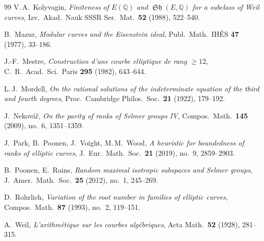 \documentclass[12pt,a4paper]{amsart}
\theoremstyle{definition}
\theoremstyle{remark}
\DeclareMathOperator{\Sha}{\mathfrak{Sh}}
\begin{document}
\begin{thebibliography}{99}
V.\,A.\ Kolyvagin,
\textit{Finiteness of $E(\mathbb{Q})$ and $\Sha(E,\mathbb{Q})$ for a subclass of
Weil curves},
Izv.\ Akad.\ Nauk SSSR Ser.\ Mat.\ \textbf{52} (1988), 522--540.

B.\ Mazur,
\textit{Modular curves and the Eisenstein ideal},
Publ.\ Math.\ IHÉS \textbf{47} (1977), 33--186.

J.-F.\ Mestre,
\textit{Construction d'une courbe elliptique de rang $\geq 12$},
C.\ R.\ Acad.\ Sci.\ Paris \textbf{295} (1982), 643--644.

L.\,J.\ Mordell,
\textit{On the rational solutions of the indeterminate equation of the third and fourth
degrees},
Proc.\ Cambridge Philos.\ Soc.\ \textbf{21} (1922), 179--192.

J.\ Nekovář,
\textit{On the parity of ranks of Selmer groups IV},
Compos.\ Math.\ \textbf{145} (2009), no.\ 6, 1351--1359.

J.\ Park, B.\ Poonen, J.\ Voight, M.\,M.\ Wood,
\textit{A heuristic for boundedness of ranks of elliptic curves},
J.\ Eur.\ Math.\ Soc.\ \textbf{21} (2019), no.\ 9, 2859--2903.

B.\ Poonen, E.\ Rains,
\textit{Random maximal isotropic subspaces and Selmer groups},
J.\ Amer.\ Math.\ Soc.\ \textbf{25} (2012), no.\ 1, 245--269.

D.\ Rohrlich,
\textit{Variation of the root number in families of elliptic curves},
Compos.\ Math.\ \textbf{87} (1993), no.\ 2, 119--151.

A.\ Weil,
\textit{L'arithmétique sur les courbes algébriques},
Acta Math.\ \textbf{52} (1928), 281--315.

\end{thebibliography}
\end{document}
